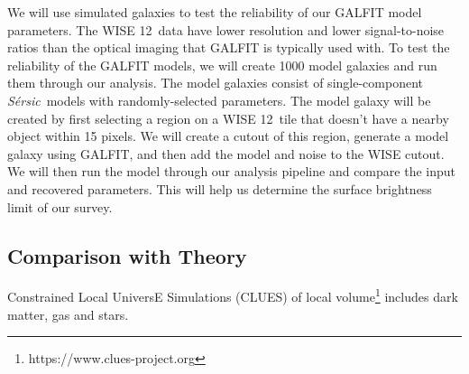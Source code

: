 \documentclass[12pt, preprint]{aastex}
\newcommand{\sers}{{\it S\'{e}rsic}}
\begin{document}
{%

We will use simulated galaxies to test the reliability of our GALFIT
model parameters.  The WISE 12\micron \ data have lower resolution and
lower signal-to-noise ratios than the optical imaging that
GALFIT is typically used with. To test the reliability of the GALFIT models, 
we will create 1000 model galaxies 
and run them through our analysis.
The model galaxies consist of single-component \sers \ models with
randomly-selected parameters.
The model galaxy will be created by first selecting 
a region on a WISE 12\micron \ tile that doesn't have a nearby object within 15
pixels.  We will create a cutout of this region, generate a model galaxy
using GALFIT, and then add 
the model and noise to the WISE cutout.
We will then run the model through our analysis pipeline and compare
the input and recovered parameters.  This will help us determine the
surface brightness limit of our survey.


\vspace*{-1cm}
\subsection{Comparison with Theory}
\vspace*{-.4cm}

Constrained Local UniversE Simulations (CLUES) of local
volume\footnote{https://www.clues-project.org} includes dark matter,
gas and stars.




}
\end{document}
